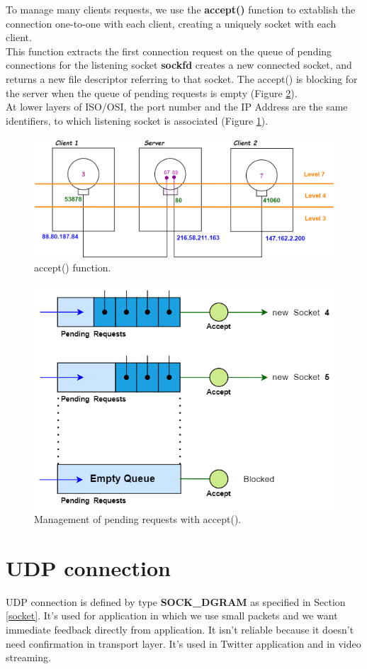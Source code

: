 To manage many clients requests, we use the \textbf{accept()} function to extablish the connection one-to-one with each client, creating a uniquely socket with each client.\\
This function extracts the  first   connection request on the queue of pending connections for the listening socket \textbf{sockfd} creates a new connected socket, and returns a new file descriptor  referring  to that socket. The accept() is blocking for the server when the queue of pending requests is empty (Figure \ref{pending_accept}).\\
At lower layers of ISO/OSI, the port number and the IP Address are the same identifiers, to which listening socket is associated (Figure \ref{accept}).
 
\begin{figure}[h]
\centering
\includegraphics[scale=0.3]{Images/NetworkC/accept}\caption{\footnotesize{accept() function.}}\label{accept}
\end{figure}

\begin{figure}[h]
\centering
\includegraphics[scale=0.4]{Images/NetworkC/pending_accept}\caption{\footnotesize{Management of pending requests with accept().}}\label{pending_accept}
\end{figure}

\section{UDP connection}
UDP connection is defined by type \textbf{SOCK\_DGRAM} as specified in Section \ref{socket}. It's used for application in which we use small packets and we want immediate feedback directly from application. It isn't reliable because it doesn't need confirmation in transport layer. It's used in Twitter application and in video streaming.